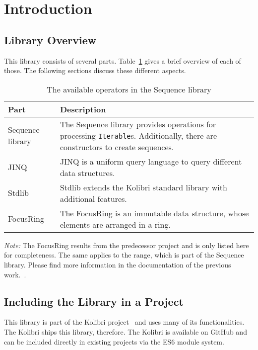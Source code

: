 \section{Introduction} %
\label{sec:Introduction}

\subsection{Library Overview} %
\label{sub:Sequence Library Overview}
This library consists of several parts. Table~\ref{tab:library_overview} gives a brief
overview of each of those. The following sections discuss these different
aspects.

\begin{table}[H]
  \centering
  \begin{tabularx}{\textwidth}{| l | X |} \hline
    \textbf{Part} & \textbf{Description} \\ \hline
    Sequence library & The Sequence library provides operations for processing \lstinline{Iterable}s. Additionally, there are constructors to create sequences.\\ \hline 
    JINQ & JINQ is a uniform query language to query different data structures. \\ \hline 
    Stdlib & Stdlib extends the Kolibri standard library with additional features. \\ \hline 
    FocusRing & The FocusRing is an immutable data structure, whose elements
    are arranged in a ring. \\ \hline 
  \end{tabularx}
  \caption{The available operators in the Sequence library}
  \label{tab:library_overview}
\end{table}

\textit{Note:} The FocusRing results from the predecessor project and is only
listed here for completeness. The same applies to the range, which is part of
the Sequence library. Please find more information in the documentation of
the previous work.~\cite{wild_ip5_2023}. 

\subsection{Including the Library in a Project} %
\label{sub:Including the Library in a Project}
This library is part of the Kolibri project~\cite{kolibri} and uses many of its
functionalities. The Kolibri ships this library, therefore. The Kolibri
is available on GitHub and can be included directly in existing projects via
the ES6 module system.
